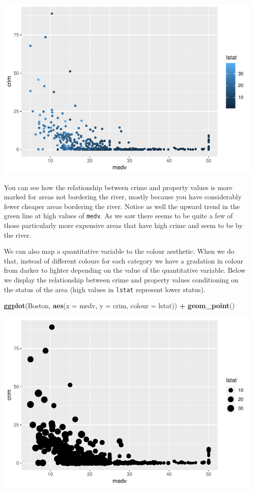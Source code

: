 \documentclass[]{book}
\newenvironment{Shaded}{\begin{snugshade}}{\end{snugshade}}
\newcommand{\DataTypeTok}[1]{\textcolor[rgb]{0.13,0.29,0.53}{#1}}
\newcommand{\KeywordTok}[1]{\textcolor[rgb]{0.13,0.29,0.53}{\textbf{#1}}}
\newcommand{\NormalTok}[1]{#1}
\newcommand{\OperatorTok}[1]{\textcolor[rgb]{0.81,0.36,0.00}{\textbf{#1}}}
\newcommand{\StringTok}[1]{\textcolor[rgb]{0.31,0.60,0.02}{#1}}
\theoremstyle{definition}
\theoremstyle{definition}
\theoremstyle{definition}
\theoremstyle{remark}
\begin{document}
\includegraphics{03-visualisation_files/figure-latex/unnamed-chunk-45-1.pdf}

You can see how the relationship between crime and property values is
more marked for areas not bordering the river, mostly because you have
considerably fewer cheaper areas bordering the river. Notice as well the
upward trend in the green line at high values of \texttt{medv}. As we
saw there seems to be quite a few of those particularly more expensive
areas that have high crime and seem to be by the river.

We can also map a quantitative variable to the colour aesthetic. When we
do that, instead of different colours for each category we have a
gradation in colour from darker to lighter depending on the value of the
quantitative variable. Below we display the relationship between crime
and property values conditioning on the status of the area (high values
in \texttt{lstat} represent lower status).

\begin{Shaded}
\begin{Highlighting}[]
\KeywordTok{ggplot}\NormalTok{(Boston, }\KeywordTok{aes}\NormalTok{(}\DataTypeTok{x =}\NormalTok{ medv, }\DataTypeTok{y =}\NormalTok{ crim, }\DataTypeTok{colour =}\NormalTok{ lstat)) }\OperatorTok{+}
\StringTok{  }\KeywordTok{geom_point}\NormalTok{() }
\end{Highlighting}
\end{Shaded}

\includegraphics{03-visualisation_files/figure-latex/unnamed-chunk-46-1.pdf}
\end{document}
